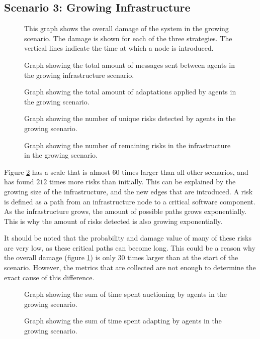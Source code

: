 \subsection{Scenario 3: Growing Infrastructure}
\begin{figure}[H]
    \centering
    
    \caption{This graph shows the overall damage of the system in the growing scenario. The damage is shown for each of the three strategies. The vertical lines indicate the time at which a node is introduced.}
    \label{fig:overall-damage-growing}
\end{figure}


\begin{figure}[H]
    \centering
    
    \caption{Graph showing the total amount of messages sent between agents in the growing infrastructure scenario.}
\end{figure}
\begin{figure}[H]
    \centering
    
    \caption{Graph showing the total amount of adaptations applied by agents in the growing scenario.}
\end{figure}
\begin{figure}[H]
    \centering
        
    \caption{Graph showing the number of unique risks detected by agents in the growing scenario.}
\end{figure}
\begin{figure}[H]
    \centering
        
    \caption{Graph showing the number of remaining risks in the infrastructure in the growing scenario.}
    \label{fig:risk-remaining-growing}
\end{figure}

Figure \ref{fig:risk-remaining-growing} has a scale that is almost $60$ times larger than all other scenarios, and has found $212$ times more risks than initially. This can be explained by the growing size of the infrastructure, and the new edges that are introduced. A risk is defined as a path from an infrastructure node to a critical software component. As the infrastructure grows, the amount of possible paths grows exponentially. This is why the amount of risks detected is also growing exponentially. 

It should be noted that the probability and damage value of many of these risks are very low, as these critical paths can become long. This could be a reason why the overall damage (figure \ref{fig:overall-damage-growing}) is only $30$ times larger than at the start of the scenario. However, the metrics that are collected are not enough to determine the exact cause of this difference.

\begin{figure}[H]
    \centering
        
    \caption{Graph showing the sum of time spent auctioning by agents in the growing scenario.}
\end{figure}
\begin{figure}[H]
    \centering
        
    \caption{Graph showing the sum of time spent adapting by agents in the growing scenario.}
\end{figure}
